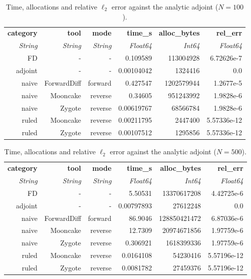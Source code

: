 \begin{table}[H]
  \centering
  \caption{Time, allocations and relative $\ell_2$ error against the analytic adjoint ($N = 100$).}
  \label{tab:scaling-N100}
\begin{tabular}{rrrrrr}
  \toprule
  \textbf{category} & \textbf{tool} & \textbf{mode} & \textbf{time\_s} & \textbf{alloc\_bytes} & \textbf{rel\_err} \\
  \textit{String} & \textit{String} & \textit{String} & \textit{Float64} & \textit{Int64} & \textit{Float64} \\
  \midrule
  FD & - & - & 0.109589 & 113004928 & 6.72626e-7 \\
  adjoint & - & - & 0.00104042 & 1324416 & 0.0 \\
  naive & ForwardDiff & forward & 0.427547 & 1202579944 & 1.2677e-5 \\
  naive & Mooncake & reverse & 0.34605 & 951243992 & 1.9828e-6 \\
  naive & Zygote & reverse & 0.00619767 & 68566784 & 1.9828e-6 \\
  ruled & Mooncake & reverse & 0.00211795 & 2447400 & 5.57336e-12 \\
  ruled & Zygote & reverse & 0.00107512 & 1295856 & 5.57336e-12 \\
  \bottomrule
\end{tabular}
\end{table}
\begin{table}[H]
  \centering
  \caption{Time, allocations and relative $\ell_2$ error against the analytic adjoint ($N = 500$).}
  \label{tab:scaling-N500}
\begin{tabular}{rrrrrr}
  \toprule
  \textbf{category} & \textbf{tool} & \textbf{mode} & \textbf{time\_s} & \textbf{alloc\_bytes} & \textbf{rel\_err} \\
  \textit{String} & \textit{String} & \textit{String} & \textit{Float64} & \textit{Int64} & \textit{Float64} \\
  \midrule
  FD & - & - & 5.50531 & 13370617208 & 4.42725e-6 \\
  adjoint & - & - & 0.00797893 & 27612248 & 0.0 \\
  naive & ForwardDiff & forward & 86.9046 & 128850421472 & 6.87036e-6 \\
  naive & Mooncake & reverse & 12.7309 & 20974671856 & 1.97759e-6 \\
  naive & Zygote & reverse & 0.306921 & 1618399336 & 1.97759e-6 \\
  ruled & Mooncake & reverse & 0.0164108 & 54230416 & 5.57196e-12 \\
  ruled & Zygote & reverse & 0.0081782 & 27459376 & 5.57196e-12 \\
  \bottomrule
\end{tabular}
\end{table}
